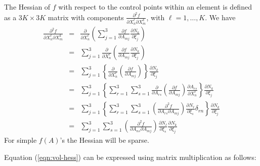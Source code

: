 \documentclass{report}
\begin{document}
 \newline
The Hessian of $f$ with respect to the control points within an element is 
defined as a $3K \times 3K$ matrix with components $\frac{\partial^2 f}{\partial X_n^\ell \partial X_m^k}$, with $\ell=1,\ldots,K$.  We have
\begin{eqnarray}
\frac{\partial^2 f}{\partial X_n^\ell \partial X_m^k} & = & \frac{\partial}{\partial X_n^\ell} \left( \sum_{j=1}^3 \frac{\partial f}{\partial A_{mj}} \frac{\partial N_k}{\partial \xi_j} \right) \\
& = & \sum_{j=1}^3  \frac{\partial}{\partial X_n^\ell} \left( \frac{\partial f}{\partial A_{mj}} \frac{\partial N_k}{\partial \xi_j} \right) \\
& = & \sum_{j=1}^3  \left\{ \frac{\partial}{\partial X_n^\ell} \left( \frac{\partial f}{\partial A_{mj}} \right) \right\} \frac{\partial N_k}{\partial \xi_j} \\
& = & \sum_{j=1}^3  \left\{ \sum_{r=1}^3 \sum_{s=1}^3 \frac{\partial}{\partial A_{rs}} \left( \frac{\partial f}{\partial A_{mj}} \right) \frac{\partial A_{rs}}{\partial X_n^\ell} \right\} \frac{\partial N_k}{\partial \xi_j} \\
& = & \sum_{j=1}^3  \left\{ \sum_{r=1}^3 \sum_{s=1}^3 \left( \frac{\partial^2 f}{\partial A_{rs} \partial A_{mj}} \right) \frac{\partial N_\ell}{\partial \xi_s} \delta_{rn} \right\} \frac{\partial N_k}{\partial \xi_j} \\
& = & \label{eqn:vol-hess} \sum_{j=1}^3  \sum_{s=1}^3 \left( \frac{\partial^2 f}{\partial A_{ns} \partial A_{mj}} \right) \frac{\partial N_\ell}{\partial \xi_s} \frac{\partial N_k}{\partial \xi_j}
\end{eqnarray}
For simple $f(A)$'s the Hessian will be sparse. \newline

\noindent Equation (\ref{eqn:vol-hess}) can be expressed using matrix multiplication as follows:
\end{document}
